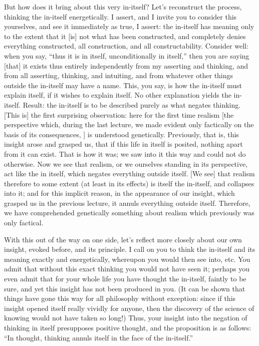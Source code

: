 But how does it bring about this very in-itself?
Let’s reconstruct the process,
thinking the in-itself energetically.
I assert, and I invite you to consider this yourselves,
and see it immediately as true, I assert:
the in-itself has meaning only to the extent
that it [is] not what has been constructed,
and completely denies everything constructed,
all construction, and all constructability.
Consider well: when you say,
“thus it is in itself, unconditionally in itself,”
then you are saying [that] it exists thus
entirely independently from my asserting and thinking,
and from all asserting, thinking, and intuiting,
and from whatever other things outside
the in-itself may have a name.
This, you say, is how the in-itself must explain itself,
if it wishes to explain itself.
No other explanation yields the in-itself.
Result: the in-itself is to be described purely
as what negates thinking.
[This is] the first surprising observation:
here for the first time realism
[the perspective which, during the last lecture,
we made evident only factically
on the basis of its consequences, ]
is understood genetically.
Previously, that is, this insight arose and grasped us,
that if this life in itself is posited,
nothing apart from it can exist.
That is how it was;
we saw into it this way
and could not do otherwise.
Now we see that realism,
or we ourselves standing in its perspective,
act like the in itself,
which negates everything outside itself.
[We see] that realism therefore to some extent
(at least in its effects) is itself the in-itself,
and collapses into it;
and for this implicit reason,
in the appearance of our insight,
which grasped us in the previous lecture,
it annuls everything outside itself.
Therefore, we have comprehended genetically
something about realism which previously was only factical.

With this out of the way on one side,
let’s reflect more closely about our own insight,
evoked before, and its principle.
I call on you to think the in-itself
and its meaning exactly and energetically,
whereupon you would then see into, etc.
You admit that without this exact thinking
you would not have seen it;
perhaps you even admit that for your whole life
you have thought the in-itself, faintly to be sure,
and yet this insight has not been produced in you.
(It can be shown that things have gone this way
for all philosophy without exception:
since if this insight opened itself really vividly for anyone,
then the discovery of the science of knowing
would not have taken so long!)
Thus, your insight into the negation of thinking in itself
presupposes positive thought,
and the proposition is as follows:
“In thought, thinking annuls itself
in the face of the in-itself.”

